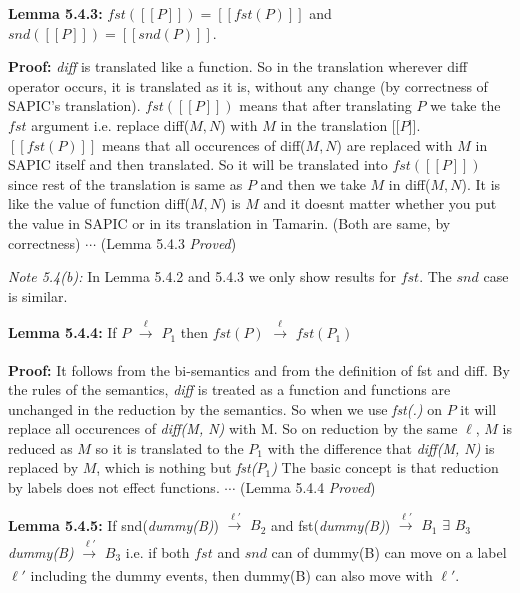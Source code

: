 \documentclass[11pt]{article}
\begin{document}
{\bf Lemma 5.4.3: }$fst([[P]])=[[fst(P)]]$ and $snd([[P]])=[[snd(P)]]$. \newline

{\bf Proof:} {\it diff} is translated like a function. So in the translation wherever diff operator occurs, it is translated as it is, without any change (by correctness of SAPIC's translation). $fst([[P]])$ means that after translating $P$ we take the $fst$ argument i.e. replace diff($M, N$) with $M$ in the translation [[$P$]]. $[[fst(P)]]$ means that all occurences of diff($M, N$) are replaced with $M$ in SAPIC itself and then translated. So it will be translated into $fst([[P]])$ since rest of the translation is same as $P$ and then we take $M$ in diff($M, N$). It is like the value of function diff($M, N$) is $M$ and it doesnt matter whether you put the value in SAPIC or in its translation in Tamarin. (Both are same, by correctness) \hfill \hfill $\cdots$ (Lemma 5.4.3 {\it Proved})\newline 

{\it Note 5.4(b): }In Lemma 5.4.2 and 5.4.3 we only show results for $fst$. The $snd$ case is similar.\newline 

{\bf Lemma 5.4.4: }If $P$ {$\xrightarrow[\text{}]{\text{$\ell$}}$} $P_1$ then $fst(P)$ {$\xrightarrow[\text{}]{\text{$\ell$}}$} $fst(P_1)$ \newline

{\bf Proof:} It follows from the bi-semantics and from the definition of fst and diff. By the rules of the semantics, {\it diff} is treated as a function and functions are unchanged in the reduction by the semantics. So when we use {\it fst(.)} on $P$ it will replace all occurences of {\it diff(M, N)} with M. So on reduction by the same $\ell$, $M$ is reduced as $M$ so it is translated to the $P_1$ with the difference that {\it diff(M, N)} is replaced by $M$, which is nothing but {\it fst($P_1$)} The basic concept is that reduction by labels does not effect functions.   \hfill \hfill $\cdots$ (Lemma 5.4.4 {\it Proved})\newline 

{\bf Lemma 5.4.5: }If snd({\it dummy(B)}) {$\xrightarrow[\text{}]{\text{$\ell'$}}$} {\it $B_2$} and fst({\it dummy(B)}) {$\xrightarrow[\text{}]{\text{$\ell'$}}$} {\it $B_1$} $\exists$ $B_3$ {\it dummy(B)} {$\xrightarrow[\text{}]{\text{$\ell'$}}$} {\it $B_3$} i.e. if both $fst$ and $snd$ can of dummy(B) can move on a label $\ell'$ including the dummy events, then dummy(B) can also move with $\ell'$.\newline
\end{document}
